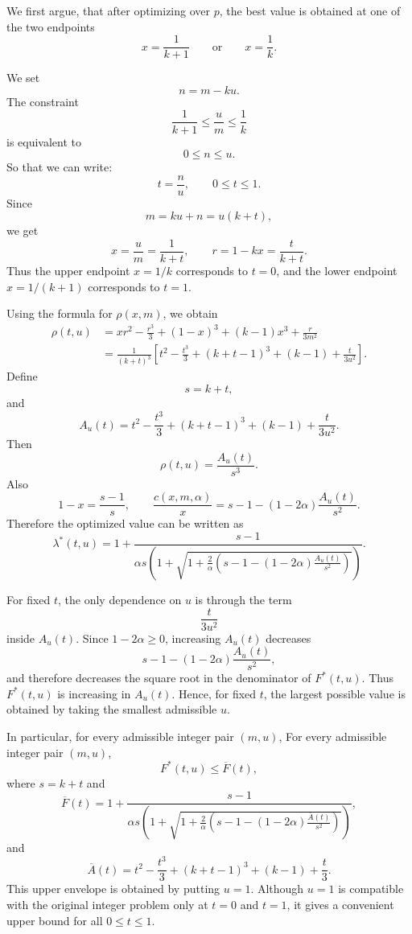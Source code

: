 \documentclass[11pt]{article}
\begin{document}
We first argue, that after optimizing over \(p\), the best value is
obtained at one of the two endpoints
\[
        x=\frac{1}{k+1}
        \qquad\text{or}\qquad
        x=\frac1k.
\]

We set
\[
        n=m-ku.
\]
The constraint
\[
        \frac{1}{k+1}\leq \frac{u}{m}\leq \frac1k
\]
is equivalent to
\[
        0\leq n\leq u.
\]
So that we can write: 
\[
        t=\frac{n}{u},
        \qquad 0\leq t\leq 1.
\]
Since
\[
        m=ku+n=u(k+t),
\]
we get
\[
        x=\frac{u}{m}=\frac{1}{k+t},
        \qquad
        r=1-kx=\frac{t}{k+t}.
\]
Thus the upper endpoint \(x=1/k\) corresponds to \(t=0\), and the lower
endpoint \(x=1/(k+1)\) corresponds to \(t=1\).

Using the formula for \(\rho(x,m)\), we obtain
\[
\begin{aligned}
\rho(t,u)
&=
xr^2-\frac{r^3}{3}
 +(1-x)^3
 +(k-1)x^3
 +\frac{r}{3m^2} \\
&=
\frac{1}{(k+t)^3}
\left[
t^2-\frac{t^3}{3}
 +(k+t-1)^3
 +(k-1)
 +\frac{t}{3u^2}
\right].
\end{aligned}
\]
Define
\[
        s=k+t,
\]
and
\[
        A_u(t)
        =
        t^2-\frac{t^3}{3}
        +(k+t-1)^3
        +(k-1)
        +\frac{t}{3u^2}.
\]
Then
\[
        \rho(t,u)=\frac{A_u(t)}{s^3}.
\]
Also
\[
        1-x=\frac{s-1}{s},
        \qquad
        \frac{c(x,m,\alpha)}{x}
        =
        s-1-(1-2\alpha)\frac{A_u(t)}{s^2}.
\]
Therefore the optimized value can be written as
\[
        \lambda^*(t,u)
        =
        1+
        \frac{s-1}{
        \alpha s\left(
        1+\sqrt{
        1+\frac{2}{\alpha}
        \left(
        s-1-(1-2\alpha)\frac{A_u(t)}{s^2}
        \right)
        }
        \right)
        }.
\]

For fixed \(t\), the only dependence on \(u\) is through the term
\[
        \frac{t}{3u^2}
\]
inside \(A_u(t)\). Since \(1-2\alpha\geq 0\), increasing \(A_u(t)\) decreases
\[
        s-1-(1-2\alpha)\frac{A_u(t)}{s^2},
\]
and therefore decreases the square root in the denominator of \(F^*(t,u)\).
Thus \(F^*(t,u)\) is increasing in \(A_u(t)\). Hence, for fixed \(t\),
the largest possible value is obtained by taking the smallest admissible
\(u\).

In particular, for every admissible integer pair \((m,u)\),
For every admissible integer pair \((m,u)\),
\[
        F^*(t,u)\leq \overline F(t),
\]
where \(s=k+t\) and
\[
        \overline F(t)
        =
        1+
        \frac{s-1}{
        \alpha s\left(
        1+\sqrt{
        1+\frac{2}{\alpha}
        \left(
        s-1-(1-2\alpha)\frac{\overline A(t)}{s^2}
        \right)
        }
        \right)
        },
\]
and
\[
        \overline A(t)
        =
        t^2-\frac{t^3}{3}
        +(k+t-1)^3
        +(k-1)
        +\frac{t}{3}.
\]
This upper envelope is obtained by putting \(u=1\). Although \(u=1\) is
compatible with the original integer problem only at \(t=0\) and \(t=1\),
it gives a convenient upper bound for all \(0\leq t\leq 1\).
\end{document}
